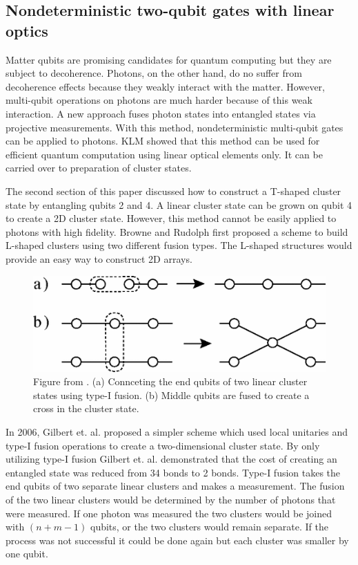 \documentclass[twocolumn]{Styles/IEEEtran11}
\begin{document}
\subsection{Nondeterministic two-qubit gates with linear optics}

Matter qubits are promising candidates for quantum computing but they are subject to decoherence. Photons, on the other hand, do no suffer from decoherence effects because they weakly interact with the matter. However, multi-qubit operations on photons are much harder because of this weak interaction. A new approach fuses photon states into entangled states via projective measurements. With this method, nondeterministic multi-qubit gates can be applied to photons. KLM \cite{klm2000} showed that this method can be used for efficient quantum computation using linear optical elements only. It can be carried over to preparation of cluster states. 

The second section of this paper discussed how to construct a T-shaped cluster state by entangling qubits 2 and 4. A linear cluster state can be grown on qubit 4 to create a 2D cluster state.  However, this method cannot be easily applied to photons with high fidelity. Browne and Rudolph \cite{browne2005efficient} first proposed a scheme to build L-shaped clusters using two different fusion types. The L-shaped structures would provide an easy way to construct 2D arrays. 
  \begin{figure}[t]
   \centering
    \includegraphics[width=\linewidth]{Images/fusiontypes.png}
    \caption{Figure from \protect\cite{browne2005efficient}. (a) Connceting the end qubits of two linear cluster states using type-I fusion. (b) Middle qubits are fused to create a cross in the cluster state.}
  \end{figure}
In 2006, Gilbert et. al. \cite{gerald2006efficient} proposed a simpler scheme which used local unitaries and type-I fusion operations to create a two-dimensional cluster state.  By only utilizing type-I fusion Gilbert et. al. demonstrated that the cost of creating an entangled state was reduced from 34 bonds to 2 bonds. Type-I fusion takes the end qubits of two separate linear clusters and makes a measurement. The fusion of the two linear clusters would be determined by the number of photons that were measured. If one photon was measured the two clusters would be joined with $(n+m-1)$ qubits, or the two clusters would remain separate. If the process was not successful it could be done again but each cluster was smaller by one qubit. 
\end{document}
